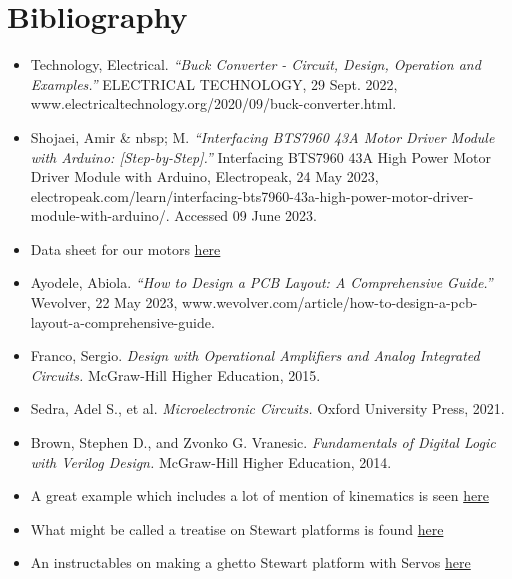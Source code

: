 \documentclass[a4paper, 10pt]{article}
\begin{document}
\section{Bibliography}
	\begin{itemize}
		\item Technology, Electrical. \textit{“Buck Converter - Circuit, Design, Operation and Examples.”} ELECTRICAL TECHNOLOGY, 29 Sept. 2022, www.electricaltechnology.org/2020/09/buck-converter.html.		
		
		\item Shojaei, Amir \& nbsp; M. \textit{“Interfacing BTS7960 43A Motor Driver Module with Arduino: [Step-by-Step].”} Interfacing BTS7960 43A High Power Motor Driver Module with Arduino, Electropeak, 24 May 2023, electropeak.com/learn/interfacing-bts7960-43a-high-power-motor-driver-module-with-arduino/. Accessed 09 June 2023.
		
		\item Data sheet for our motors \href{https://www.servocity.com/content/downloads/118_rpm_hd_precision_planetary_gearmotor_-_specifications_1.pdf} {here}
		
		\item Ayodele, Abiola. \textit{“How to Design a PCB Layout: A Comprehensive Guide.”} Wevolver, 22 May 2023, www.wevolver.com/article/how-to-design-a-pcb-layout-a-comprehensive-guide.
		
		\item Franco, Sergio. \textit{Design with Operational Amplifiers and Analog Integrated Circuits.} McGraw-Hill Higher Education, 2015.
				
		\item Sedra, Adel S., et al. \textit{Microelectronic Circuits.} Oxford University Press, 2021. 		
		
		\item Brown, Stephen D., and Zvonko G. Vranesic. \textit{Fundamentals of Digital Logic with Verilog Design.} McGraw-Hill Higher Education, 2014. 
		
		\item A great example which includes a lot of mention of kinematics is seen \href{https://ntrs.nasa.gov/api/citations/19910007810/downloads/19910007810.pdf}{here}
		
		\item What might be called a treatise on Stewart platforms is found \href{https://www.ri.cmu.edu/pub_files/pub4/fong_terrence_w_1990_1/fong_terrence_w_1990_1.pdf}{here}
		
		\item An instructables on making a ghetto Stewart platform with Servos \href{https://www.instructables.com/Stewart-Platform/}{here}
		

\end{itemize}
\end{document}
